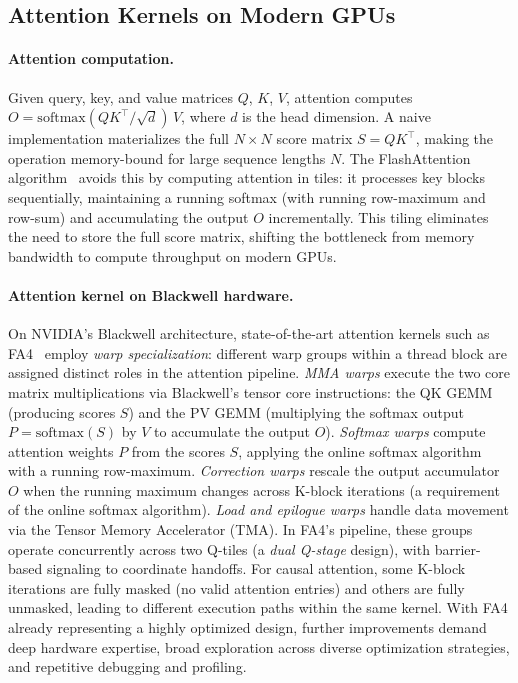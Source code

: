 \subsection{Attention Kernels on Modern GPUs}
\label{sec:background_attention}

\paragraph{Attention computation.}
Given query, key, and value matrices $Q$, $K$, $V$, attention computes $O = \mathrm{softmax}(QK^\top / \sqrt{d})\, V$, where $d$ is the head dimension.
A naive implementation materializes the full $N \times N$ score matrix $S = QK^\top$, making the operation memory-bound for large sequence lengths $N$.
The FlashAttention algorithm~\citep{dao2022flashattention} avoids this by computing attention in tiles: it processes key blocks sequentially, maintaining a running softmax (with running row-maximum and row-sum) and accumulating the output $O$ incrementally.
This tiling eliminates the need to store the full score matrix, shifting the bottleneck from memory bandwidth to compute throughput on modern GPUs.

\paragraph{Attention kernel on Blackwell hardware.}
On NVIDIA's Blackwell architecture, state-of-the-art attention kernels such as FA4~\citep{zadouri2026flashattention4} employ \emph{warp specialization}: different warp groups within a thread block are assigned distinct roles in the attention pipeline.
\emph{MMA warps} execute the two core matrix multiplications via Blackwell's tensor core instructions: the QK GEMM (producing scores $S$) and the PV GEMM (multiplying the softmax output $P = \mathrm{softmax}(S)$ by $V$ to accumulate the output $O$).
\emph{Softmax warps} compute attention weights $P$ from the scores $S$, applying the online softmax algorithm with a running row-maximum.
\emph{Correction warps} rescale the output accumulator $O$ when the running maximum changes across K-block iterations (a requirement of the online softmax algorithm).
\emph{Load and epilogue warps} handle data movement via the Tensor Memory Accelerator (TMA).
In FA4's pipeline, these groups operate concurrently across two Q-tiles (a \emph{dual Q-stage} design), with barrier-based signaling to coordinate handoffs.
For causal attention, some K-block iterations are fully masked (no valid attention entries) and others are fully unmasked, leading to different execution paths within the same kernel.
With FA4 already representing a highly optimized design, further improvements demand deep hardware expertise, broad exploration across diverse optimization strategies, and repetitive debugging and profiling.
